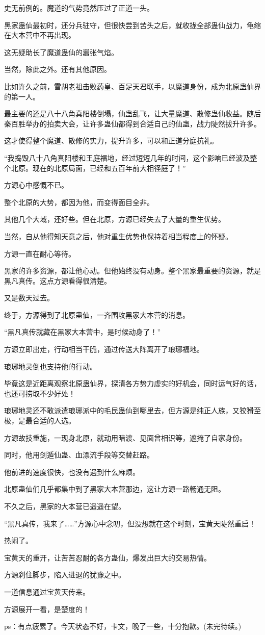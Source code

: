 \begin{this_body}
史无前例的。魔道的气势竟然压过了正道一头。

黑家蛊仙最初时，还分兵驻守，但很快尝到苦头之后，就收拢全部蛊仙战力，龟缩在大本营中不再出现。

这无疑助长了魔道蛊仙的嚣张气焰。

当然，除此之外。还有其他原因。

比如许久之前，雪胡老祖击败药皇、百足天君联手，以魔道身份，成为北原蛊仙界的第一人。

最主要的还是八十八角真阳楼倒塌，仙蛊乱飞，让大量魔道、散修蛊仙收益。随后秦百胜举办的拍卖大会，让许多蛊仙都得到合适自己的仙蛊，战力陡然拔升许多。

这才使得整个魔道、散修的实力，提升许多，可以和正道分庭抗礼。

“我捣毁八十八角真阳楼和王庭福地，经过短短几年的时间，这个影响已经波及整个北原。现在的北原局面，已经和五百年前大相径庭了！”

方源心中感慨不已。

整个北原的大势，都因为他，而变得面目全非。

其他几个大域，还好些。但在北原，方源已经失去了大量的重生优势。

当然，自从他得知天意之后，他对重生优势也保持着相当程度上的怀疑。

方源一直在耐心等待。

黑家的许多资源，都让他心动。但他始终没有动身。整个黑家最重要的资源，就是黑凡真传。这点方源看得很清楚。

又是数天过去。

终于，方源得到了北原蛊仙，一齐围攻黑家大本营的消息。

“黑凡真传就藏在黑家大本营中，是时候动身了！”

方源立即出走，行动相当干脆，通过传送大阵离开了琅琊福地。

琅琊地灵倒也支持他的行动。

毕竟这是近距离观察北原蛊仙界，探清各方势力虚实的好机会，同时运气好的话，也还可捞取不少好处！

琅琊地灵还不敢派遣琅琊派中的毛民蛊仙到哪里去，但方源是纯正人族，又狡猾至极，是最合适的人选。

方源故技重施，一现身北原，就动用暗渡、见面曾相识等，遮掩了自家身份。

同时，他用剑遁仙蛊、血漂流手段等交替赶路。

他前进的速度很快，也没有遇到什么麻烦。

北原蛊仙们几乎都集中到了黑家大本营那边，这让方源一路畅通无阻。

不久之后，黑家的大本营已遥遥在望。

“黑凡真传，我来了……”方源心中念叨，但没想就在这个时刻，宝黄天陡然重启！

热闹了。

宝黄天的重开，让苦苦忍耐的各方蛊仙，爆发出巨大的交易热情。

方源刹住脚步，陷入进退的犹豫之中。

一道信息通过宝黄天传来。

方源展开一看，是楚度的！

ps：有点疲累了。今天状态不好，卡文，晚了一些，十分抱歉。(未完待续。)

\end{this_body}

